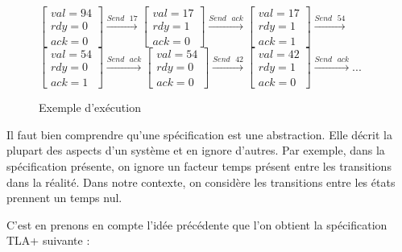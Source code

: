\documentclass[12pt,a4paper]{article}
\begin{document}
\begin{figure}[ht]
	\begin{center}
		$\begin{bmatrix}
			val = 94 \\
			rdy = 0 \\
			ack = 0 
		\end{bmatrix}
		\xrightarrow{Send \text{ } 17}
		\begin{bmatrix}
			val = 17 \\
			rdy = 1 \\
			ack = 0 
		\end{bmatrix}
		\xrightarrow{Send \text{ } ack}
		\begin{bmatrix}
			val = 17 \\
			rdy = 1 \\
			ack = 1 
		\end{bmatrix}
		\xrightarrow{Send \text{ } 54}
		$\vspace{0.5cm}
		$		
		\begin{bmatrix}
			val = 54 \\
			rdy = 0 \\
			ack = 1 
		\end{bmatrix}
		\xrightarrow{Send \text{ } ack}
		\begin{bmatrix}
			val = 54 \\
			rdy = 0 \\
			ack = 0 
		\end{bmatrix}
		\xrightarrow{Send \text{ } 42}
		\begin{bmatrix}
			val = 42 \\
			rdy = 1 \\
			ack = 0 
		\end{bmatrix}
		\xrightarrow{Send \text{ } ack} ...$
	\end{center}
	\caption{Exemple d'exécution}
\end{figure}

Il faut bien comprendre qu'une spécification est une abstraction. Elle décrit la plupart des aspects d'un système et en ignore d'autres. Par exemple, dans la spécification présente,  on ignore un facteur temps présent entre les transitions dans la réalité. Dans notre contexte, on considère les transitions entre les états prennent un temps nul.

C'est en prenons en compte l'idée précédente que l'on obtient la spécification TLA+ suivante :
\end{document}
